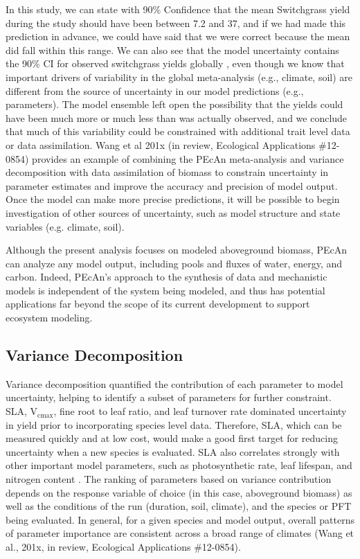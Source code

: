 \documentclass[12pt]{article}
\begin{document}
\begin{flushleft}
\begin{spacing}{1.9}
 In this study, we can state with 90\% Confidence that the mean Switchgrass yield during the \citet{heaton2008mub} study should have been between 7.2 and 37, and if we had made this prediction in advance, we could have said that we were correct because the mean did fall within this range.
 We can also see that the model uncertainty contains the 90\% CI for observed switchgrass yields globally \citep{wang2010qrc}, even though we know that important drivers of variability in the global meta-analysis (e.g., climate, soil) are different from the source of uncertainty in our model predictions (e.g., parameters).
 The model ensemble left open the possibility that the yields could have been much more or much less than was actually observed, and we conclude that much of this variability could be constrained with additional trait level data or data assimilation. 
  Wang et al 201x (in review, Ecological Applications \#12-0854) provides an example of combining the PEcAn meta-analysis and variance decomposition with data assimilation of biomass to constrain uncertainty in parameter estimates and improve the accuracy and precision of model output. Once the model can make more precise predictions, it will be possible to begin investigation of other sources of uncertainty, such as model structure and state variables (e.g. climate, soil).

 Although the present analysis focuses on modeled aboveground biomass, PEcAn can analyze any model output, including pools and fluxes of water, energy, and carbon.
 Indeed, PEcAn's approach to the synthesis of data and mechanistic models is independent of the system being modeled, and thus has potential applications far beyond the scope of its current development to support ecosystem modeling.
 

\subsection*{Variance Decomposition}

 Variance decomposition quantified the contribution of each parameter to model uncertainty, helping to identify a subset of parameters for further constraint.
 SLA,  V$_{\text{cmax}}$, fine root to leaf ratio, and leaf turnover rate dominated uncertainty in yield prior to incorporating species level data.
 Therefore, SLA, which can be measured quickly and at low cost, would make a good first target for reducing uncertainty when a new species is evaluated.
 SLA also correlates strongly with other important model parameters, such as photosynthetic rate, leaf lifespan, and nitrogen content \citep{wright2004wwl}. 
  The ranking of parameters based on variance contribution depends on the response variable of choice (in this case, aboveground biomass) as well as the conditions of the run (duration, soil, climate), and the species or PFT being evaluated.
  In general, for a given species and model output, overall patterns of parameter importance are consistent across a broad range of climates (Wang et al., 201x, in review, Ecological Applications \#12-0854).


\end{spacing}
\end{flushleft}
\end{document}
